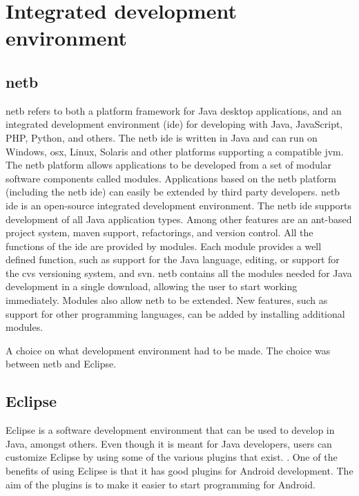 \section{Integrated development environment}

\subsection{\gls{netb}}
\gls{netb} refers to both a platform framework for Java desktop applications, and an integrated development environment (\gls{ide}) for developing with Java, JavaScript, PHP, Python, and others.
The \gls{netb} \gls{ide} is written in Java and can run on Windows, \gls{osx}, Linux, Solaris and other platforms supporting a compatible \gls{jvm}. 
\newline
\newline
The \gls{netb} platform allows applications to be developed from a set of modular software components called modules. Applications based on the \gls{netb} platform (including the \gls{netb} \gls{ide}) can easily be extended by third party developers. \cite{bib:netbeans}
\newline
\newline
\gls{netb} \gls{ide} is an open-source integrated development environment. The \gls{netb} \gls{ide} supports development of all Java application types. Among other features are an \gls{ant}-based project system, \gls{maven} support, refactorings, and version control. \cite{bib:ide}
\newline
\newline
All the functions of the \gls{ide} are provided by modules. Each module provides a well defined function, such as support for the Java language, editing, or support for the \gls{cvs} versioning system, and \gls{svn}. \gls{netb} contains all the modules needed for Java development in a single download, allowing the user to start working immediately. Modules also allow \gls{netb} to be extended. New features, such as support for other programming languages, can be added by installing additional modules.

A choice on what development environment had to be made. The choice was between \gls{netb} and Eclipse.

\subsection{Eclipse}
Eclipse is a software development environment that can be used to develop in Java, amongst others. Even though it is meant for Java developers, users can customize Eclipse by using some of the various plugins that exist. \cite{bib:eclipse}.
\newline
\newline
One of the benefits of using Eclipse is that it has good plugins for Android development. The aim of the plugins is to make it easier to start programming for Android.

